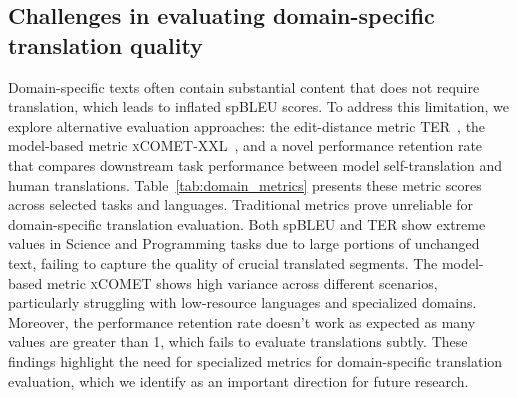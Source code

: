 \subsection{Challenges in evaluating domain-specific translation quality}
Domain-specific texts often contain substantial content that does not require translation, which leads to inflated spBLEU scores.
To address this limitation, we explore alternative evaluation approaches: the edit-distance metric TER~\cite{snover2006study}, the model-based metric \textsc{xCOMET}-XXL~\cite{guerreiro2024xcomet}, and a novel performance retention rate that compares downstream task performance between model self-translation and human translations.
Table~\ref{tab:domain_metrics} presents these metric scores across selected tasks and languages. %
Traditional metrics prove unreliable for domain-specific translation evaluation.
Both spBLEU and TER show extreme values in Science and Programming tasks due to large portions of unchanged text, failing to capture the quality of crucial translated segments.
The model-based metric \textsc{xCOMET} shows high variance across different scenarios, particularly struggling with low-resource languages and specialized domains.
Moreover, the performance retention rate doesn't work as expected as many values are greater than 1, which fails to evaluate translations subtly.
These findings highlight the need for specialized metrics for domain-specific translation evaluation, which we identify as an important direction for future research.


